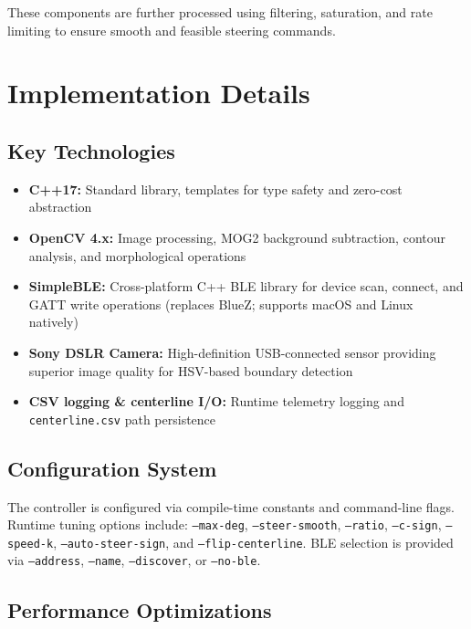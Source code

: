 \documentclass[twocolumn]{article}
\begin{document}
These components are further processed using filtering, saturation, and rate limiting to ensure smooth and feasible steering commands.
\section{Implementation Details}

\subsection{Key Technologies}

\begin{itemize}
  \item \textbf{C++17:} Standard library, templates for type safety and zero-cost abstraction
 \item \textbf{OpenCV 4.x:} Image processing, MOG2 background subtraction, contour analysis, and morphological operations~\cite{bradski2000opencv}
  \item \textbf{SimpleBLE:} Cross-platform C++ BLE library for device scan, connect, and GATT write operations (replaces BlueZ; supports macOS and Linux natively)~\cite{simpleble}
  \item \textbf{Sony DSLR Camera:} High-definition USB-connected sensor providing superior image quality for HSV-based boundary detection
  \item \textbf{CSV logging \& centerline I/O:} Runtime telemetry logging and \texttt{centerline.csv} path persistence

\end{itemize}

\subsection{Configuration System}

The controller is configured via compile-time constants and command-line flags. Runtime tuning options include: \texttt{--max-deg}, \texttt{--steer-smooth}, \texttt{--ratio}, \texttt{--c-sign}, \texttt{--speed-k}, \texttt{--auto-steer-sign}, and \texttt{--flip-centerline}. BLE selection is provided via \texttt{--address}, \texttt{--name}, \texttt{--discover}, or \texttt{--no-ble}.

\subsection{Performance Optimizations}
\end{document}
